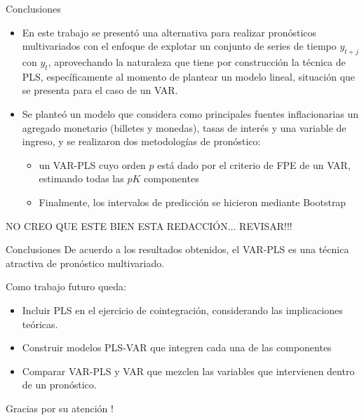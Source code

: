 \documentclass{beamer}
\newcommand{\?}{?`}
\begin{document}
\begin{frame}{Conclusiones}
  \begin{itemize}
  \item En este trabajo se present\'o una alternativa para realizar
    pron\'osticos multivariados con el enfoque de explotar un
    conjunto de series de tiempo $y_{t+j}$ con $y_t$, aprovechando la
    naturaleza que tiene por construcci\'on la t\'ecnica de PLS,
    espec\'ificamente al momento de plantear un modelo lineal,
    situaci\'on que se presenta para el caso de un VAR.
  \item Se plante\'o un modelo que considera como principales fuentes
    inflacionarias un agregado monetario (billetes y monedas), tasas
    de inter\'es y una variable de ingreso, y se realizaron dos
    metodolog\'ias de pron\'ostico:
    \begin{itemize}
    \item un VAR-PLS cuyo orden $p$ est\'a dado por el criterio de FPE
      de un VAR, estimando todas las $pK$ componentes
    \item Finalmente, los intervalos de predicci\'on se hicieron
      mediante Bootstrap
    \end{itemize}
  \end{itemize}
  NO CREO QUE ESTE BIEN ESTA REDACCI\'ON... REVISAR!!!
\end{frame}

\begin{frame}{Conclusiones}
  De acuerdo a los resultados obtenidos, el VAR-PLS es una t\'ecnica
  atractiva de pron\'ostico multivariado.
  \medskip
  
  Como trabajo futuro queda:
  \begin{itemize}
  \item Incluir PLS en el ejercicio de cointegraci\'on, considerando
    las implicaciones te\'oricas.
  \item Construir modelos PLS-VAR que integren cada una de las
    componentes
  \item Comparar VAR-PLS y VAR que mezclen las variables que
    intervienen dentro de un pron\'ostico.
  \end{itemize}

\end{frame}

\begin{frame}{}
  \begin{block}{}
    \begin{center}
      \vspace{3mm}
      {\Large Gracias por su atenci\'on !}
      \vspace{3mm}
    \end{center}
  \end{block}
\end{frame}
\end{document}
